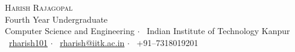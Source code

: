 \newcommand{\sep}{$\cdot$ }  %

\begin{center}

\textsc{\huge Harish Rajagopal}\\[2mm]
Fourth Year Undergraduate\\[1mm]
Computer Science and Engineering \sep\ Indian Institute of Technology Kanpur\\[1mm]
{\faGithub\ \href{https://github.com/rharish101}{rharish101}} \sep%
{\faEnvelopeO\ \href{mailto:rharish@iitk.ac.in}{rharish@iitk.ac.in}} \sep%
{\faMobile\ +91--7318019201}

\end{center}
